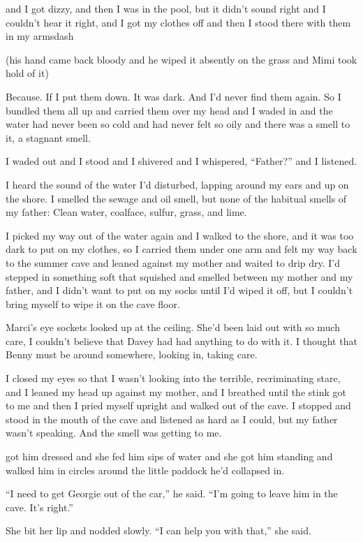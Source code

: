and I got dizzy, and then I was in the pool, but it didn't sound right
and I couldn't hear it right, and I got my clothes off and then I
stood there with them in my armsdash{}

(his hand came back bloody and he wiped it absently on the grass and
Mimi took hold of it)

Because.  If I put them down.  It was dark.  And I'd never find them
again.  So I bundled them all up and carried them over my head and I
waded in and the water had never been so cold and had never felt so
oily and there was a smell to it, a stagnant smell.

I waded out and I stood and I shivered and I whispered, ``Father?''
and I listened.

I heard the sound of the water I'd disturbed, lapping around my ears
and up on the shore.  I smelled the sewage and oil smell, but none of
the habitual smells of my father:  Clean water, coalface, sulfur,
grass, and lime.

I picked my way out of the water again and I walked to the shore, and
it was too dark to put on my clothes, so I carried them under one arm
and felt my way back to the summer cave and leaned against my mother
and waited to drip dry.  I'd stepped in something soft that squished
and smelled between my mother and my father, and I didn't want to put
on my socks until I'd wiped it off, but I couldn't bring myself to
wipe it on the cave floor.

Marci's eye sockets looked up at the ceiling.  She'd been laid out
with so much care, I couldn't believe that Davey had had anything to
do with it.  I thought that Benny must be around somewhere, looking
in, taking care.

I closed my eyes so that I wasn't looking into the terrible,
recriminating stare, and I leaned my head up against my mother, and I
breathed until the stink got to me and then I pried myself upright and
walked out of the cave.  I stopped and stood in the mouth of the cave
and listened as hard as I could, but my father wasn't speaking.  And
the smell was getting to me.

 got him dressed and she fed him sips of water and she got him
standing and walked him in circles around the little paddock he'd
collapsed in.

``I need to get Georgie out of the car,'' he said.  ``I'm going to
leave him in the cave.  It's right.''

She bit her lip and nodded slowly.  ``I can help you with that,'' she
said.

